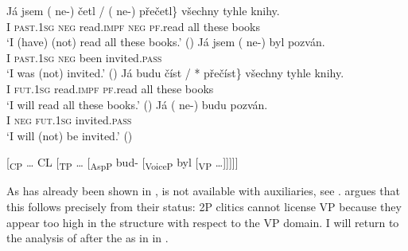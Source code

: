 \documentclass[output=paper,colorlinks,citecolor=brown,]{langsci/langscibook}
\begin{document}
\begin{exe}
\ex	\label{11}
\begin{xlist}
\ex\label{11a} \gll Já jsem \minsp{\{} (\hspace{-2pt} ne-) četl / (\hspace{-2pt} ne-) přečetl\} všechny tyhle knihy.\\
I  \textsc{past}.\textsc{1sg} {} {} \textsc{neg} read.\textsc{impf}  {} {} \textsc{neg} \textsc{pf}.read all these books\\
\glt  `I (have) (not) read all these books.' \hfill ()
\ex\label{11b} \gll Já jsem  (\hspace{-2pt} ne-) byl pozván.\\
I  \textsc{past}.\textsc{1sg} {} \textsc{neg} been invited.\textsc{pass} \\
\glt `I was (not) invited.' \hfill ()
\ex\label{11c}\gll Já budu \minsp{\{} číst / *\hspace{-2pt} přečíst\} všechny tyhle knihy.\\
I \textsc{fut}.\textsc{1sg} {} read.\textsc{impf} {} {} \textsc{pf}.read all these books\\
\glt   `I will read all these books.'  \hfill ()
\ex\label{11d}\gll Já (\hspace{-2pt} ne-) budu  pozván.\\
I  {} \textsc{neg} \textsc{fut}.\textsc{1sg} invited.\textsc{pass}\\
\glt `I will (not) be invited.'  \hfill ()
\end{xlist}

\ex \label{12} {[\textsubscript{CP} {\ldots} CL [\textsubscript{TP} {\ldots} [\textsubscript{AspP} bud- [\textsubscript{VoiceP}  byl [\textsubscript{VP} {\ldots}]]]]]}
\end{exe}

\noindent As has already been shown in ,  is not available with  auxiliaries, see . \cite{Gruet-Skrabalova2012} argues that this follows precisely from their  status: 2P clitics cannot license VP  because they appear too high in the structure with respect to the VP domain. I will return to the analysis of  after the  as in  in .

\ea\label{13}
\z\z
\end{document}
